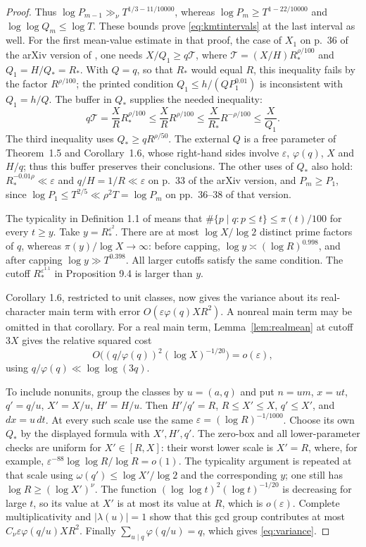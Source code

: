 \documentclass[11pt]{article}
\theoremstyle{definition}
\newcommand{\ph}{\varphi}
\begin{document}
\begin{proof}
Thus $\log P_{m-1}\gg_\nu T^{1/3-11/10000}$,
whereas $\log P_m\ge T^{1-22/10000}$ and
$\log\log Q_m\le\log T$. These bounds prove
\eqref{eq:kmtintervals} at the last interval as well.
For the first mean-value estimate in that proof, the case of $X_1$
on p.~36 of the arXiv version of \cite{KMT}, one needs $X/Q_1\ge q\mathcal T$, where
$\mathcal T=(X/H)R_*^{\rho/100}$ and $Q_1=H/Q_*=R_*$.
With $Q=q$, so that $R_*$ would equal $R$, this inequality fails by
the factor $R^{\rho/100}$;
the printed condition $Q_1\le h/(QP_1^{0.01})$ is inconsistent
with $Q_1=h/Q$. The buffer in $Q_*$ supplies the needed inequality:
\[
 q\mathcal T=\frac XR R_*^{\rho/100}
 \le\frac XR R^{\rho/100}
 \le\frac X{R_*}R^{-\rho/100}\le\frac X{Q_1}.
\]
The third inequality uses $Q_*\ge qR^{\rho/50}$.
The external $Q$ is a free parameter of Theorem~1.5 and Corollary~1.6,
whose right-hand sides involve $\varepsilon$, $\ph(q)$, $X$ and $H/q$;
thus this buffer preserves their conclusions.
The other uses of $Q_*$ also hold: $R_*^{-0.01\rho}\ll\varepsilon$
and $q/H=1/R\ll\varepsilon$ on p.~33 of the arXiv version, and $P_m\ge P_1$, since
$\log P_1\le T^{2/5}\ll\rho^2T=\log P_m$ on pp.~36--38 of that version.

The typicality in Definition 1.1 of \cite{KMT} means that
$\#\{p\mid q:p\le t\}\le\pi(t)/100$ for every $t\ge y$.
Take $y=R_*^{\varepsilon^2}$.
There are at most $\log X/\log2$ distinct prime factors of $q$, whereas
$\pi(y)/\log X\to\infty$: before capping,
$\log y\asymp(\log R)^{0.998}$, and after capping
$\log y\gg T^{0.398}$.
All larger cutoffs satisfy the same condition. The cutoff
$R_*^{\varepsilon^{1.1}}$ in Proposition 9.4 is larger than $y$.

Corollary 1.6, restricted to unit classes, now gives the variance about
its real-character main term with error
$O(\varepsilon\ph(q)X R^2)$. A nonreal main term may be omitted in
that corollary. For a real main term,
Lemma~\ref{lem:realmean} at cutoff $3X$ gives the relative squared cost
\[
 O\bigl((q/\ph(q))^2(\log X)^{-1/20}\bigr)=o(\varepsilon),
\]
using $q/\ph(q)\ll\log\log(3q)$.

To include nonunits, group the classes by $u=(a,q)$ and put
$n=um$, $x=ut$, $q'=q/u$, $X'=X/u$, $H'=H/u$.
Then $H'/q'=R$, $R\le X'\le X$, $q'\le X'$, and $dx=u\,dt$.
At every such scale use the same $\varepsilon=(\log R)^{-1/1000}$.
Choose its own $Q_*$ by the displayed formula with $X',H',q'$.
The zero-box and all lower-parameter checks are uniform for
$X'\in[R,X]$: their worst lower scale is $X'=R$, where, for example,
$\varepsilon^{-88}\log\log R/\log R=o(1)$.
The typicality argument is repeated at that scale using
$\omega(q')\le\log X'/\log2$ and the corresponding $y$; one still has
$\log R\ge(\log X')^\nu$.
The function $(\log\log t)^2(\log t)^{-1/20}$ is decreasing for large
$t$, so its value at $X'$ is at most its value at $R$, which is
$o(\varepsilon)$.
Complete multiplicativity and $|\lambda(u)|=1$ show that this gcd group
contributes at most $C_\nu\varepsilon\ph(q/u)X R^2$.
Finally $\sum_{u\mid q}\ph(q/u)=q$, which gives \eqref{eq:variance}.
\end{proof}
\end{document}
